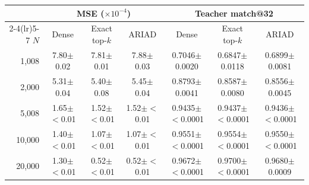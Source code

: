 \begin{tabular}{r ccc ccc}
\toprule
 & \multicolumn{3}{c}{MSE ($\times10^{-4}$)} & \multicolumn{3}{c}{Teacher match@32} \\
\cmidrule(lr){2-4}\cmidrule(lr){5-7}
$N$ & Dense & Exact top-$k$ & ARIAD & Dense & Exact top-$k$ & ARIAD \\
\midrule
1,008 & 7.80$\pm$0.02 & 7.81$\pm$0.01 & 7.88$\pm$0.03 & 0.7046$\pm$0.0020 & 0.6847$\pm$0.0118 & 0.6899$\pm$0.0081 \\
2,000 & 5.31$\pm$0.04 & 5.40$\pm$0.08 & 5.45$\pm$0.04 & 0.8793$\pm$0.0041 & 0.8587$\pm$0.0080 & 0.8556$\pm$0.0045 \\
5,008 & 1.65$\pm$$<$0.01 & 1.52$\pm$$<$0.01 & 1.52$\pm$$<$0.01 & 0.9435$\pm$$<$0.0001 & 0.9437$\pm$$<$0.0001 & 0.9436$\pm$$<$0.0001 \\
10,000 & 1.40$\pm$$<$0.01 & 1.07$\pm$$<$0.01 & 1.07$\pm$$<$0.01 & 0.9551$\pm$$<$0.0001 & 0.9554$\pm$$<$0.0001 & 0.9550$\pm$$<$0.0001 \\
20,000 & 1.30$\pm$$<$0.01 & 0.52$\pm$$<$0.01 & 0.52$\pm$$<$0.01 & 0.9672$\pm$$<$0.0001 & 0.9700$\pm$$<$0.0001 & 0.9680$\pm$0.0009 \\
\bottomrule
\end{tabular}
